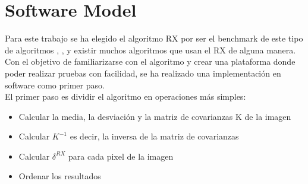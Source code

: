 \cleardoublepage
\chapter{Software Model}
Para este trabajo se ha elegido el algoritmo RX por ser el benchmark de este tipo de algoritmos \cite{borghys_hyperspectral_2012}, \cite{rosario_semiparametric_2012}, \cite{matteoli_tutorial_2010} y existir muchos algoritmos que usan el RX de alguna manera.
\\
Con el objetivo de familiarizarse con el algoritmo y crear una plataforma donde poder realizar pruebas con facilidad, se ha realizado una implementación en software como primer paso.
\\
El primer paso es dividir el algoritmo en operaciones más simples:
\begin{itemize}
\item Calcular la media, la desviación y la matriz de covarianzas K de la imagen
\item Calcular $K^{-1}$ es decir, la inversa de la matriz de covarianzas
\item Calcular $\delta ^{RX}$ para cada pixel de la imagen
\item Ordenar los resultados
\end{itemize}
\pagebreak
